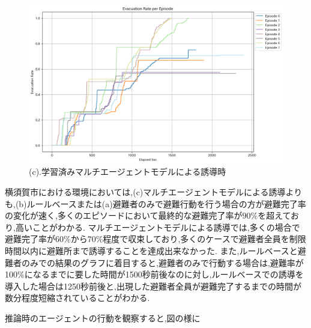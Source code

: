 \begin{figure}[H]
  \vspace{1em} %
  \begin{minipage}{0.65\textwidth}
      \centering
      \includegraphics[width=\textwidth]{Figures/Yokosuka-AgentModel-ERE.png} %
      \caption{(c).学習済みマルチエージェントモデルによる誘導時}
      \label{fig:graph-c}
  \end{minipage}
\end{figure}
横須賀市における環境においては,(c)マルチエージェントモデルによる誘導よりも,(b)ルールベースまたは(a)避難者のみで避難行動を行う場合の方が避難完了率の変化が速く,多くのエピソードにおいて最終的な避難完了率が$90\%$を超えており,高いことがわかる.
マルチエージェントモデルによる誘導では,多くの場合で避難完了率が60\%から70\%程度で収束しており,多くのケースで避難者全員を制限時間以内に避難所まで誘導することを達成出来なかった.
また,ルールベースと避難者のみでの結果のグラフに着目すると,避難者のみで行動する場合は,避難率が100\%になるまでに要した時間が1500秒前後なのに対し,ルールベースでの誘導を導入した場合は1250秒前後と,出現した避難者全員が避難完了するまでの時間が数分程度短縮されていることがわかる.\par
推論時のエージェントの行動を観察すると,図の様に

